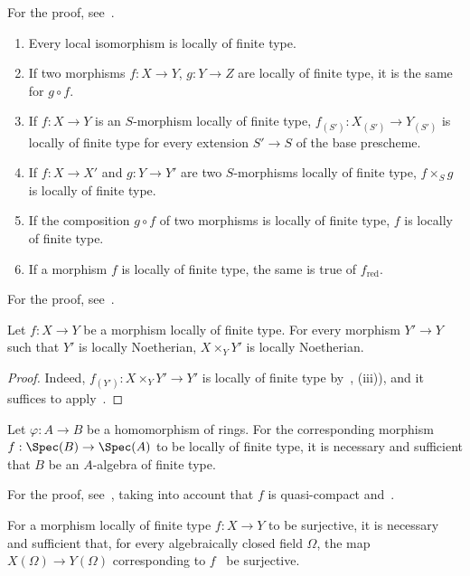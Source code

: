 For the proof, see~.

\begin{proposition}[1.3.4]
\label{IV.1.3.4}
\medskip\noindent
\begin{enumerate}[label=(\roman*)]
  \item Every local isomorphism is locally of finite type.
  \item If two morphisms $f:X\to Y$, $g:Y\to Z$ are locally of finite type, it is the same for $g\circ f$.
  \item If $f:X\to Y$ is an $S$-morphism locally of finite type, $f_{(S')}:X_{(S')}\to Y_{(S')}$ is
    locally of finite type for every extension $S'\to S$ of the base prescheme.
  \item If $f:X\to X'$ and $g:Y\to Y'$ are two $S$-morphisms locally of finite type, $f\times_S g$
    is locally of finite type.
  \item If the composition $g\circ f$ of two morphisms is locally of finite type, $f$ is locally of
    finite type.
  \item If a morphism $f$ is locally of finite type, the same is true of $f_{\mathrm{red}}$.
\end{enumerate}
\end{proposition}

For the proof, see~.

\begin{corollary}[1.3.5]
\label{IV.1.3.5}
Let $f:X\to Y$ be a morphism locally of finite type. For every
morphism $Y'\to Y$ such that $Y'$ is locally Noetherian, $X\times_Y Y'$ is locally Noetherian.
\end{corollary}

\begin{proof}
Indeed, $f_{(Y')}:X\times_Y Y'\to Y'$ is locally of finite type by~, (iii)), and it
suffices to apply~.
\end{proof}

\begin{proposition}[1.3.6]
\label{IV.1.3.6}
Let $\varphi:A\to B$ be a homomorphism of rings. For the
corresponding morphism $f:\Spec(B)\to\Spec(A)$ to be locally of finite type, it is necessary and sufficient
that $B$ be an $A$-algebra of finite type.
\end{proposition}

For the proof, see~, taking into account that $f$ is quasi-compact and~.

\begin{proposition}[1.3.7]
\label{IV.1.3.7}
For a morphism locally of finite type $f:X\to Y$ to be
surjective, it is necessary and sufficient that, for every algebraically closed field $\Omega$, the map $X(\Omega)\to Y(\Omega)$
corresponding to $f$~ be surjective.
\end{proposition}

